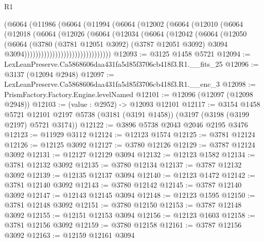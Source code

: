 \begin{lexlean}{R1}
\begin{coremodule}
                          (@6064
                            (@11986
                              (@6064
                                (@11994
                                  (@6064
                                    (@12002
                                      (@6064
                                        (@12010
                                          (@6064
                                            (@12018
                                              (@6064
                                                (@12026
                                                  (@6064
                                                    (@12034
                                                      (@6064
                                                        (@12042
                                                          (@6064
                                                            (@12050
                                                              (@6064
                                                                (@3780
                                                                  (@3781 @12051 @3092)
                                                                  (@3787 @12051 @3092)
                                                                  @3094
                                                                  @3094)))))))))))))))))))))))))))))))
@12093 := @3125 @1458 @5721
@12094 := LexLeanPreserve.Ca5868606daa431fa5d85f3706cb418f3.R1.__fits_25
@12096 := @3137 (@12094 @2948)
@12097 := LexLeanPreserve.Ca5868606daa431fa5d85f3706cb418f3.R1.__enc_3
@12098 := PrismFactory.Factory.Engine.levelNamed
@12101 := @12096 (@12097 (@12098 @2948))
@12103 := (value : @2952) -> @12093 @12101
@12117 := @3154
    @1458
    @5721
    @12101
    @2197
    @5738
    (@3181 (@3191 @1458))
    (@3197 (@3198 (@3199 @2197) @5721 @3174))
@12122 := @3896 @5738 @2043 @2046 @2195 @3476
@12123 := @11929 @3112
@12124 := @12123 @1574
@12125 := @3781 @12124
@12126 := @12125 @3092
@12127 := @3780 @12126
@12129 := @3787 @12124 @3092
@12131 := @12127 @12129 @3094
@12132 := @12123 @1582
@12134 := @3781 @12132 @3092
@12135 := @3780 @12134
@12137 := @3787 @12132 @3092
@12139 := @12135 @12137 @3094
@12140 := @12123 @1472
@12142 := @3781 @12140 @3092
@12143 := @3780 @12142
@12145 := @3787 @12140 @3092
@12147 := @12143 @12145 @3094
@12148 := @12123 @1595
@12150 := @3781 @12148 @3092
@12151 := @3780 @12150
@12153 := @3787 @12148 @3092
@12155 := @12151 @12153 @3094
@12156 := @12123 @1603
@12158 := @3781 @12156 @3092
@12159 := @3780 @12158
@12161 := @3787 @12156 @3092
@12163 := @12159 @12161 @3094

\end{coremodule}
\end{lexlean}
